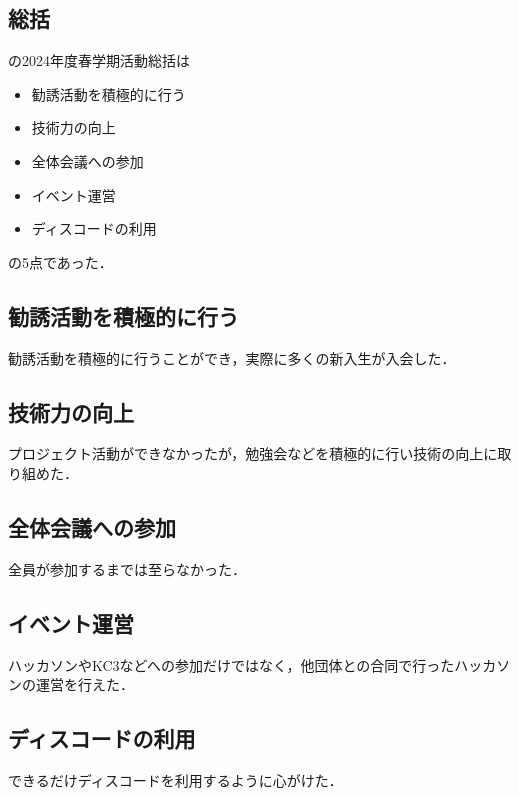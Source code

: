 \subsection*{\thirdGrade{}総括}




\thirdGrade{}の2024年度春学期活動総括は
\begin{itemize}
    \item 勧誘活動を積極的に行う
    \item 技術力の向上
    \item 全体会議への参加
    \item イベント運営
    \item ディスコードの利用
\end{itemize}
の5点であった．

\subsection*{勧誘活動を積極的に行う}
勧誘活動を積極的に行うことができ，実際に多くの新入生が入会した．

\subsection*{技術力の向上}
プロジェクト活動ができなかったが，勉強会などを積極的に行い技術の向上に取り組めた．

\subsection*{全体会議への参加}
全員が参加するまでは至らなかった．

\subsection*{イベント運営}
ハッカソンやKC3などへの参加だけではなく，他団体との合同で行ったハッカソンの運営を行えた．

\subsection*{ディスコードの利用}
できるだけディスコードを利用するように心がけた．

